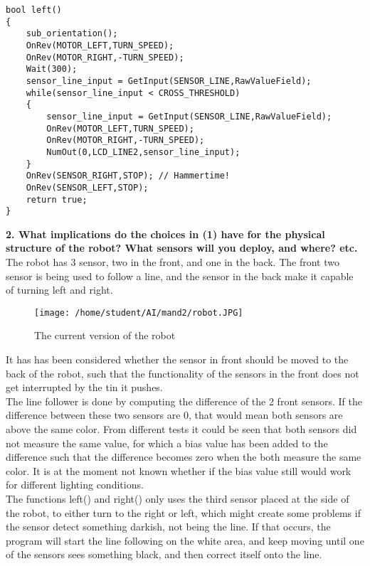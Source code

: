 \documentclass[10pt,a4paper]{article}
\begin{document}
     
\begin{lstlisting}
bool left()
{
    sub_orientation();
    OnRev(MOTOR_LEFT,TURN_SPEED);
    OnRev(MOTOR_RIGHT,-TURN_SPEED);
    Wait(300);  
    sensor_line_input = GetInput(SENSOR_LINE,RawValueField);
    while(sensor_line_input < CROSS_THRESHOLD)
    {       
        sensor_line_input = GetInput(SENSOR_LINE,RawValueField);
        OnRev(MOTOR_LEFT,TURN_SPEED);
        OnRev(MOTOR_RIGHT,-TURN_SPEED);        
        NumOut(0,LCD_LINE2,sensor_line_input);
    }  
    OnRev(SENSOR_RIGHT,STOP); // Hammertime!
    OnRev(SENSOR_LEFT,STOP);  
    return true;
}
\end{lstlisting}
    
     
   \textbf{2.  What implications do the choices in (1) have for the physical structure of the
     robot?  What sensors will you deploy, and where?  etc.}\\


The robot has 3 sensor,  two in the front, and one in the back.  The front two sensor is being used to follow a line, and the sensor in the back make it capable of turning left and right. 
	\begin{figure}[H]
	\begin{center}
    \texttt{[image: /home/student/AI/mand2/robot.JPG]}
  \end{center}
  \caption{The current version of the robot}
\end{figure}   			

It has has been considered  whether the sensor in front should be moved to the back of the robot, such that the functionality of the sensors in the front does not get interrupted by the tin it pushes. \\


The line follower is done by computing the difference of the 2 front sensors.  If the difference between these two sensors are 0, that would mean both sensors are above the same color.    From different tests it could be seen that both sensors did not measure the same value, for which a bias value has been added to the difference such that the difference becomes zero when the both measure the same color.  It is at the moment not known whether if the bias value still would work for different lighting conditions.\\

The functions left() and right() only uses the third sensor placed at the side of the robot, to either turn to the right or left,  which might create some problems if the sensor detect something darkish, not being the line.  If that occurs, the program will start the line following on the white area, and keep moving until one of the sensors sees something black, and then correct itself onto the line.\\\\
 
\end{document}

